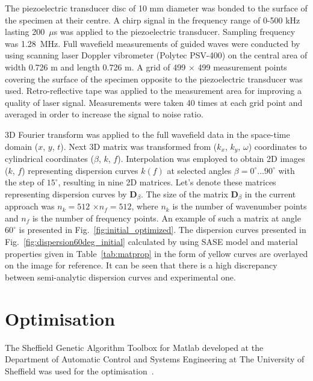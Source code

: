 \documentclass[preprint,12pt]{elsarticle}
\newcommand{\matr}[1]{\mathbf{#1}} %
\begin{document}
The piezoelectric transducer disc of 10 mm diameter  was bonded to the surface of the specimen at their centre. A chirp signal in the frequency range of 0-500 kHz lasting 200~$\mu$s was applied to the piezoelectric transducer. Sampling frequency was 1.28~MHz. Full wavefield measurements of guided waves were conducted by using scanning laser Doppler vibrometer (Polytec PSV-400) on the central area of width 0.726 m and length 0.726 m. A grid of 499 $\times$ 499 measurement points covering the surface of the specimen opposite to the piezoelectric transducer was used. Retro-reflective tape was applied to the measurement area for improving a quality of laser signal. Measurements were taken 40 times at each grid point and averaged in order to increase the signal to noise ratio.

3D Fourier transform was applied to the full wavefield data in the space-time domain ($x$, $y$, $t$). Next 3D matrix was transformed from ($k_x$, $k_y$, $\omega$) coordinates to cylindrical coordinates ($\beta$, $k$, $f$). Interpolation was employed to obtain 2D images ($k$, $f$) representing dispersion curves $k(f)$ at selected angles $\beta = 0^{\circ} \ldots 90^{\circ}$ with the step of $15^{\circ}$, resulting in nine 2D matrices. Let's denote these matrices representing dispersion curves by $\matr{D}_{\beta}$. The size of the matrix  $\matr{D}_{\beta}$ in the current approach was $n_k=512$ $\times$$n_f= 512$, where $n_k$ is the number of wavenumber points and $n_f$ is the number of frequency points.  An example of such a matrix at angle $ 60^{\circ}$ is presented in Fig.~\ref{fig:initial_optimized}. The dispersion curves presented in Fig.~\ref{fig:dispersion60deg_initial} calculated by using SASE model and material properties given in Table~\ref{tab:matprop} in the form of yellow curves are overlayed on the image for reference. It can be seen that there is a high discrepancy between semi-analytic dispersion curves and experimental one. 
	\section{Optimisation \label{sec:optimization}}
	The Sheffield Genetic Algorithm Toolbox for Matlab developed at the Department of Automatic Control and Systems Engineering at The University of Sheffield was used for the optimisation~\cite{Chipperfield1994}.
	
\end{document}
